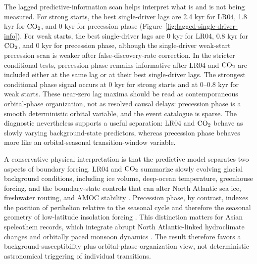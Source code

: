\documentclass[11pt]{article}
\begin{document}
The lagged predictive-information scan helps interpret what is and is not being measured. For strong starts, the best single-driver lags are 2.4 kyr for LR04, 1.8 kyr for \(\ce{CO2}\), and 0 kyr for precession phase (Figure~\ref{fig:lagged-single-driver-info}). For weak starts, the best single-driver lags are 0 kyr for LR04, 0.8 kyr for \(\ce{CO2}\), and 0 kyr for precession phase, although the single-driver weak-start precession scan is weaker after false-discovery-rate correction. In the stricter conditional tests, precession phase remains informative after LR04 and \(\ce{CO2}\) are included either at the same lag or at their best single-driver lags. The strongest conditional phase signal occurs at 0 kyr for strong starts and at 0--0.8 kyr for weak starts. These near-zero lag maxima should be read as contemporaneous orbital-phase organization, not as resolved causal delays: precession phase is a smooth deterministic orbital variable, and the event catalogue is sparse. The diagnostic nevertheless supports a useful separation: LR04 and \(\ce{CO2}\) behave as slowly varying background-state predictors, whereas precession phase behaves more like an orbital-seasonal transition-window variable.

A conservative physical interpretation is that the predictive model separates two aspects of boundary forcing. LR04 and \(\ce{CO2}\) summarize slowly evolving glacial background conditions, including ice volume, deep-ocean temperature, greenhouse forcing, and the boundary-state controls that can alter North Atlantic sea ice, freshwater routing, and AMOC stability \citep{lisiecki2005pliocene,zhang2017abrupt,vettoretti2022atmospheric,zhang2021direct}. Precession phase, by contrast, indexes the position of perihelion relative to the seasonal cycle and therefore the seasonal geometry of low-latitude insolation forcing \citep{berger1978long,berger1991insolation}. This distinction matters for Asian speleothem records, which integrate abrupt North Atlantic-linked hydroclimate changes and orbitally paced monsoon dynamics \citep{cheng2016asian,corrick2020synchronous,xie2023contributions}. The result therefore favors a background-susceptibility plus orbital-phase-organization view, not deterministic astronomical triggering of individual transitions.
\end{document}
